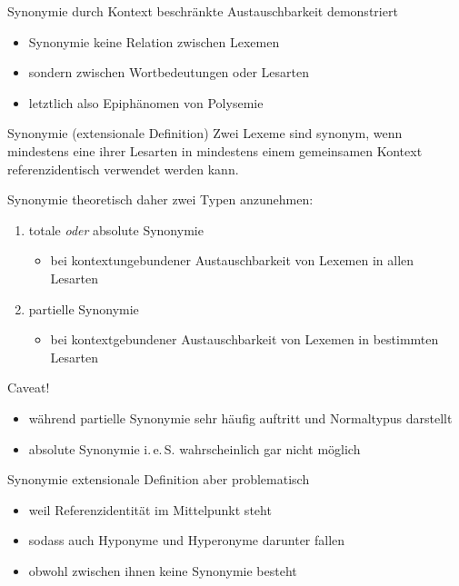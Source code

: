 \begin{frame}{Synonymie}
\onslide<+->
durch Kontext beschränkte Austauschbarkeit demonstriert
\begin{itemize}[<+->]
	\item		Synonymie keine Relation zwischen Lexemen
	\item		sondern zwischen Wortbedeutungen oder Lesarten
	\item		letztlich also Epiphänomen von Polysemie
\end{itemize}
\onslide<+->
\Zeile
\begin{block}{Synonymie (extensionale Definition)}
Zwei Lexeme sind synonym, wenn mindestens eine ihrer Lesarten in mindestens einem gemeinsamen Kontext referenzidentisch verwendet werden
kann. \citep[67 (modifiziert)]{Harm2015}
\end{block}
\end{frame}

\begin{frame}{Synonymie}
\onslide<+->
theoretisch daher zwei Typen anzunehmen:
\begin{enumerate}[<+->]
	\item		totale \textit{oder} absolute Synonymie
	\begin{itemize}[<+->]
		\item		bei kontextungebundener Austauschbarkeit von Lexemen in allen Lesarten
	\end{itemize}
	\item		partielle Synonymie
	\begin{itemize}[<+->]
		\item		bei kontextgebundener Austauschbarkeit von Lexemen in bestimmten Lesarten
	\end{itemize}
\end{enumerate}
\onslide<+->
\Zeile
\begin{block}{Caveat!}
\begin{itemize}[<+->]
	\item		während partielle Synonymie sehr häufig auftritt und Normaltypus darstellt
	\item		absolute Synonymie i.\,e.\,S. wahrscheinlich gar nicht möglich
\end{itemize}
\end{block}
\end{frame}

\begin{frame}{Synonymie}
\onslide<+->
extensionale Definition aber problematisch
\begin{itemize}[<+->]
	\item		weil Referenzidentität im Mittelpunkt steht
	\item		sodass auch Hyponyme und Hyperonyme darunter fallen
	\item		obwohl zwischen ihnen keine Synonymie besteht
\end{itemize}
\onslide<+->
\Zeile
\begin{exe}
\end{exe}
\end{frame}


